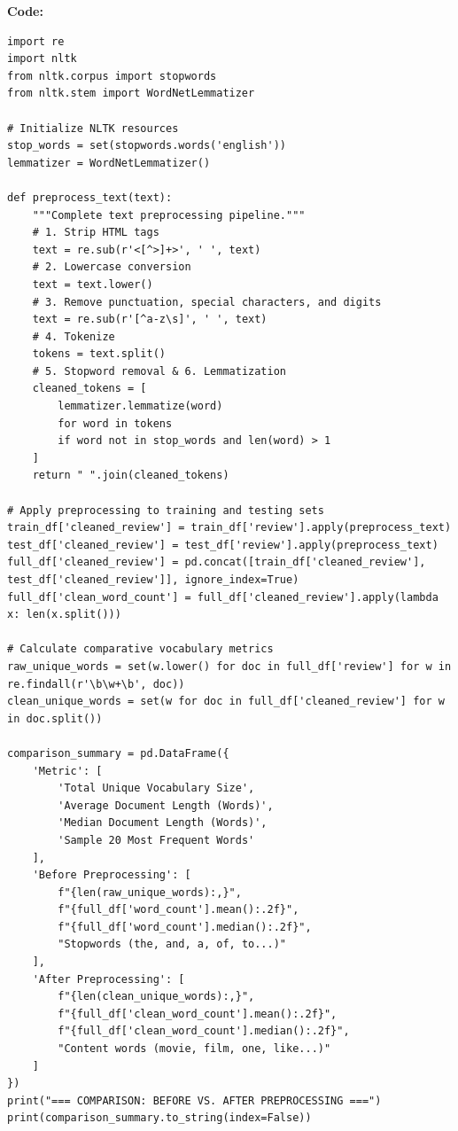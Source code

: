 \documentclass[12pt]{article}
\begin{document}
\textbf{Code:}

\begin{lstlisting}[style=code]
import re
import nltk
from nltk.corpus import stopwords
from nltk.stem import WordNetLemmatizer

# Initialize NLTK resources
stop_words = set(stopwords.words('english'))
lemmatizer = WordNetLemmatizer()

def preprocess_text(text):
    """Complete text preprocessing pipeline."""
    # 1. Strip HTML tags
    text = re.sub(r'<[^>]+>', ' ', text)
    # 2. Lowercase conversion
    text = text.lower()
    # 3. Remove punctuation, special characters, and digits
    text = re.sub(r'[^a-z\s]', ' ', text)
    # 4. Tokenize
    tokens = text.split()
    # 5. Stopword removal & 6. Lemmatization
    cleaned_tokens = [
        lemmatizer.lemmatize(word) 
        for word in tokens 
        if word not in stop_words and len(word) > 1
    ]
    return " ".join(cleaned_tokens)

# Apply preprocessing to training and testing sets
train_df['cleaned_review'] = train_df['review'].apply(preprocess_text)
test_df['cleaned_review'] = test_df['review'].apply(preprocess_text)
full_df['cleaned_review'] = pd.concat([train_df['cleaned_review'], test_df['cleaned_review']], ignore_index=True)
full_df['clean_word_count'] = full_df['cleaned_review'].apply(lambda x: len(x.split()))

# Calculate comparative vocabulary metrics
raw_unique_words = set(w.lower() for doc in full_df['review'] for w in re.findall(r'\b\w+\b', doc))
clean_unique_words = set(w for doc in full_df['cleaned_review'] for w in doc.split())

comparison_summary = pd.DataFrame({
    'Metric': [
        'Total Unique Vocabulary Size',
        'Average Document Length (Words)',
        'Median Document Length (Words)',
        'Sample 20 Most Frequent Words'
    ],
    'Before Preprocessing': [
        f"{len(raw_unique_words):,}",
        f"{full_df['word_count'].mean():.2f}",
        f"{full_df['word_count'].median():.2f}",
        "Stopwords (the, and, a, of, to...)"
    ],
    'After Preprocessing': [
        f"{len(clean_unique_words):,}",
        f"{full_df['clean_word_count'].mean():.2f}",
        f"{full_df['clean_word_count'].median():.2f}",
        "Content words (movie, film, one, like...)"
    ]
})
print("=== COMPARISON: BEFORE VS. AFTER PREPROCESSING ===")
print(comparison_summary.to_string(index=False))
\end{lstlisting}
\end{document}
